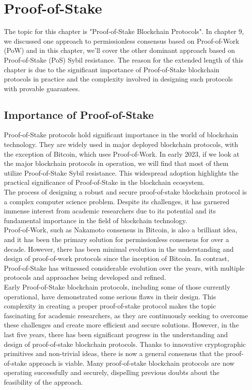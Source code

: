 \chapter{Proof-of-Stake}
The topic for this chapter is "Proof-of-Stake Blockchain Protocols". In chapter 9, we discussed one approach to permissionless consensus based on Proof-of-Work (PoW) and in this chapter, we'll cover the other dominant approach based on Proof-of-Stake (PoS) Sybil resistance. The reason for the extended length of this chapter is due to the significant importance of Proof-of-Stake blockchain protocols in practice and the complexity involved in designing such protocols with provable guarantees.

\section*{Importance of Proof-of-Stake}
Proof-of-Stake protocols hold significant importance in the world of blockchain technology. They are widely used in major deployed blockchain protocols, with the exception of Bitcoin, which uses Proof-of-Work. In early 2023, if we look at the major blockchain protocols in operation, we will find that most of them utilize Proof-of-Stake Sybil resistance. This widespread adoption highlights the practical significance of Proof-of-Stake in the blockchain ecosystem.\\
The process of designing a robust and secure proof-of-stake blockchain protocol is a complex computer science problem. Despite its challenges, it has garnered immense interest from academic researchers due to its potential and its fundamental importance in the field of blockchain technology.\\
Proof-of-Work, such as Nakamoto consensus in Bitcoin, is also a brilliant idea, and it has been the primary solution for permissionless consensus for over a decade. However, there has been minimal evolution in the understanding and design of proof-of-work protocols since the inception of Bitcoin. In contrast, Proof-of-Stake has witnessed considerable evolution over the years, with multiple protocols and approaches being developed and refined.\\
Early Proof-of-Stake blockchain protocols, including some of those currently operational, have demonstrated some serious flaws in their design. This complexity in creating a proper proof-of-stake protocol makes the topic fascinating for academic researchers, as they are continuously seeking to overcome these challenges and create more efficient and secure solutions. However, in the last five years, there has been significant progress in the understanding and design of proof-of-stake blockchain protocols. Thanks to innovative cryptographic primitives and non-trivial ideas, there is now a general consensus that the proof-of-stake approach is viable. Many proof-of-stake blockchain protocols are now operating successfully and securely, dispelling previous doubts about the feasibility of the approach.\\
